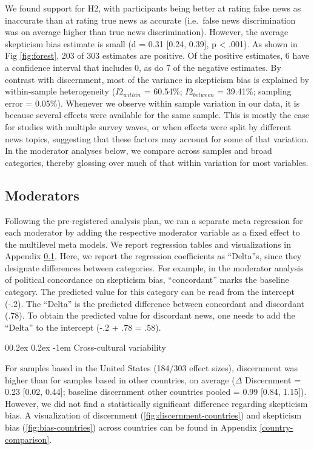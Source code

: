 \documentclass[
  doc,floatsintext]{apa6}
\makeatletter
\let\oldparagraph\paragraph
\renewcommand{\paragraph}[1]{\oldparagraph{#1}\mbox{}}
\renewcommand{\paragraph}{\@startsection{paragraph}{4}{\parindent}%
  {0\baselineskip \@plus 0.2ex \@minus 0.2ex}%
  {-1em}%
  {\normalfont\normalsize\bfseries\itshape\typesectitle}}
\makeatother
\begin{document}
We found support for H2, with participants being better at rating false news as inaccurate than at rating true news as accurate (i.e.~false news discrimination was on average higher than true news discrimination). However, the average skepticism bias estimate is small (d = 0.31 {[}0.24, 0.39{]}, p \textless{} .001). As shown in Fig \ref{fig:forest}, 203 of 303 estimates are positive. Of the positive estimates, 6 have a confidence interval that includes 0, as do 7 of the negative estimates. By contrast with discernment, most of the variance in skepticism bias is explained by within-sample heterogeneity (\(I2_{within}\) = 60.54\%; \(I2_{between}\) = 39.41\%; sampling error = 0.05\%). Whenever we observe within sample variation in our data, it is because several effects were available for the same sample. This is mostly the case for studies with multiple survey waves, or when effects were split by different news topics, suggesting that these factors may account for some of that variation. In the moderator analyses below, we compare across samples and broad categories, thereby glossing over much of that within variation for most variables.

\subsection{Moderators}\label{moderators}

Following the pre-registered analysis plan, we ran a separate meta regression for each moderator by adding the respective moderator variable as a fixed effect to the multilevel meta models. We report regression tables and visualizations in Appendix \ref{moderators}. Here, we report the regression coefficients as ``Delta''s, since they designate differences between categories. For example, in the moderator analysis of political concordance on skepticism bias, ``concordant'' marks the baseline category. The predicted value for this category can be read from the intercept (-.2). The ``Delta'' is the predicted difference between concordant and discordant (.78). To obtain the predicted value for discordant news, one needs to add the ``Delta'' to the intercept (-.2 + .78 = .58).

\paragraph{Cross-cultural variability}\label{cross-cultural-variability}

For samples based in the United States (184/303 effect sizes), discernment was higher than for samples based in other countries, on average (\(\Delta\) Discernment = 0.23 {[}0.02, 0.44{]}; baseline discernment other countries pooled = 0.99 {[}0.84, 1.15{]}). However, we did not find a statistically significant difference regarding skepticism bias. A visualization of discernment (\ref{fig:discernment-countries}) and skepticism bias (\ref{fig:bias-countries}) across countries can be found in Appendix \ref{country-comparison}.
\end{document}

